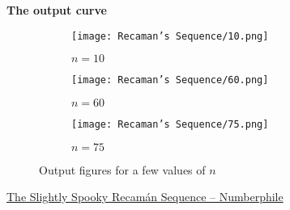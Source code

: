 \documentclass[../../Problems]{subfiles}
\begin{document}
\textbf{The output curve}
\begin{figure}[H]
	\centering
	\begin{subfigure}{0.3\linewidth}
		\texttt{[image: Recaman's Sequence/10.png]}
		\caption{$n=10$}
	\end{subfigure}
	\begin{subfigure}{0.3\linewidth}
		\texttt{[image: Recaman's Sequence/60.png]}
		\caption{$n=60$}
	\end{subfigure}
	\begin{subfigure}{0.3\linewidth}
		\texttt{[image: Recaman's Sequence/75.png]}
		\caption{$n=75$}
	\end{subfigure}
	\caption{Output figures for a few values of $n$}
\end{figure}
\begin{funvideo}
	\href{https://youtu.be/FGC5TdIiT9U}{The Slightly Spooky Recamán Sequence -- Numberphile}
\end{funvideo}
\recalctypearea
\end{document}
